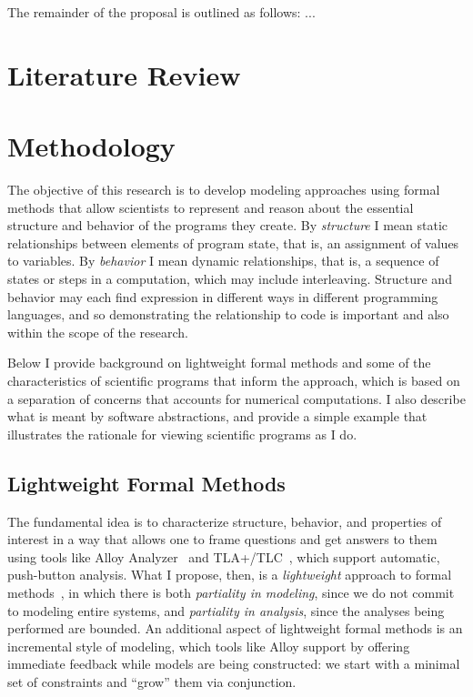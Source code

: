 \documentclass[12pt]{article}
\begin{document}
The remainder of the proposal is outlined as follows: ...

\section{Literature Review}

\section{Methodology}

The objective of this research is to develop modeling approaches using
formal methods that allow scientists to represent and reason about the
essential structure and behavior of the programs they create.  By
\emph{structure} I mean static relationships between elements of program
state, that is, an assignment of values to
variables. By \emph{behavior} I mean dynamic relationships, that is,
a sequence of states or steps in a computation, which may include
interleaving.  Structure and behavior may each find expression in
different ways in different programming languages, and so
demonstrating the relationship to code is
important and also within the scope of the research.

Below I provide background on lightweight formal methods and some of the characteristics of scientific programs that inform the approach, which is based on a separation of concerns that accounts for numerical computations.  I also describe what is meant by software abstractions, and provide a simple example that illustrates the rationale for viewing scientific programs as I do.

\subsection{Lightweight Formal Methods}

The fundamental idea is to characterize structure, behavior, and
properties of interest in a way that allows one to frame questions and
get answers to them using tools like Alloy
Analyzer~\citep{jackson2012} and
TLA+/\allowbreak{}TLC~\citep{lamport2002}, which support automatic,
push-button analysis.  What I propose, then, is a \emph{lightweight}
approach to formal methods~\citep{jackson1996b}, in which there is
both \emph{partiality in modeling}, since we do not commit to modeling
entire systems, and \emph{partiality in analysis}, since the analyses
being performed are bounded.  An additional aspect of lightweight
formal methods is an incremental style of modeling, which tools like
Alloy support by offering immediate feedback while models are being
constructed: we start with a minimal set of constraints and ``grow''
them via conjunction.
\end{document}
